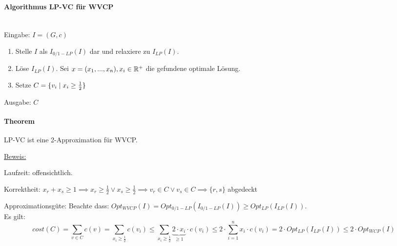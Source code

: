 \paragraph{Algorithmus LP-VC für WVCP} \mbox{} \\
Eingabe: $I=(G, c)$
\begin{enumerate}
    \item Stelle $I$ als $I_{0/1-LP}(I)$ dar und relaxiere zu $I_{LP}(I)$.
    \item Löse $I_{LP}(I)$. Sei $x = (x_1, ..., x_n), x_i \in \mathbb{R}^+$ die gefundene optimale Lösung.
    \item Setze $C = \{ v_i \; | \; x_i \geq \frac{1}{2} \}$
\end{enumerate}
Ausgabe: $C$

\paragraph{Theorem}
LP-VC ist eine 2-Approximation für WVCP.

\underline{Beweis:}

Laufzeit: offensichtlich.

Korrektheit: $x_r + x_s \geq 1 \implies x_r \geq \frac{1}{2} \vee x_s \geq \frac{1}{2}
\implies v_r \in C \vee v_s \in C \implies \{r, s\}$ abgedeckt

Approximationsgüte:
Beachte dass: $ Opt_{WVCP}(I) = Opt_{0/1-LP}(I_{0/1-LP}(I)) \geq Opt_{LP}(I_{LP}(I)) $. \\
Es gilt:
$$ cost(C)
     = \sum_{v \in C} c(v)
     = \sum_{x_i \geq \frac{1}{2}} c(v_i)
  \leq \sum_{x_i \geq \frac{1}{2}} \underbrace{2 \cdot x_i}_{\geq 1} \cdot c(v_i)
  \leq 2 \cdot \sum_{i=1}^n x_i \cdot c(v_i)
     = 2 \cdot Opt_{LP}(I_{LP}(I))
  \leq 2 \cdot Opt_{WCP}(I)
$$
